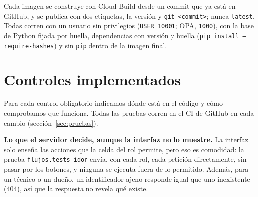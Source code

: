 \documentclass[11pt,letterpaper]{article}
\newcommand{\cod}[1]{\texttt{\small #1}}
\begin{document}
Cada imagen se construye con Cloud Build desde un commit que ya está en GitHub, y se publica con dos
etiquetas, la versión y \cod{git-<commit>}; nunca \cod{latest}. Todas corren con un usuario sin
privilegios (\cod{USER 10001}; OPA, \cod{1000}), con la base de Python fijada por huella, dependencias
con versión y huella (\cod{pip install --require-hashes}) y sin \cod{pip} dentro de la imagen final.

\section{Controles implementados}

Para cada control obligatorio indicamos dónde está en el código y cómo comprobamos que funciona. Todas las pruebas corren en el CI de GitHub en cada cambio (sección~\ref{sec:pruebas}).

\begin{nota}
\textbf{Lo que el servidor decide, aunque la interfaz no lo muestre.} La interfaz solo enseña las acciones que la celda del rol permite, pero eso es comodidad: la prueba \cod{flujos.tests\_idor} envía, con cada rol, cada petición directamente, sin pasar por los botones, y ninguna se ejecuta
fuera de lo permitido. Además, para un técnico o un dueño, un identificador ajeno responde igual que uno inexistente (404), así que la respuesta no revela qué existe.
\end{nota}
\end{document}
